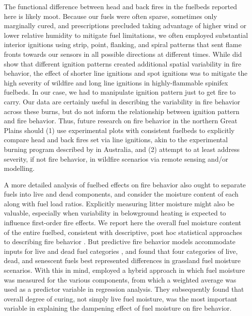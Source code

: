 \documentclass[referee, 
		     sn-basic]{sn-jnl}
\begin{document}
\begin{linenumbers}
The functional difference between head and back fires in the fuelbeds reported here is likely moot. 
Because our fuels were often sparse, sometimes only marginally cured, and prescriptions precluded taking advantage of higher wind or lower relative humidity to mitigate fuel
limitations, we often employed substantial interior ignitions using
strip, point, flanking, and spiral patterns that sent flame fronts
towards our sensors in all possible directions at different times. While
\citet{williams2015} did show that different ignition patterns created
additional spatial variability in fire behavior, the effect of shorter
line ignitions and spot ignitions was to mitigate the high severity of
wildfire and long line ignitions in highly-flammable spinifex fuelbeds.
In our case, we had to manipulate ignition pattern just to get fire to
carry. Our data are certainly useful in describing the variability in
fire behavior across these burns, but do not inform the relationship
between ignition pattern and fire behavior. Thus, future research on
fire behavior in the northern Great Plains should (1) use experimental
plots with consistent fuelbeds to explicitly compare head and back fires
set via line ignitions, akin to the experimental burning program
described by \citet{cruz2015} in Australia, and (2) attempt to at least
address severity, if not fire behavior, in wildfire scenarios via remote
sensing and/or modelling.

A more detailed analysis of fuelbed effects on fire behavior also ought
to separate fuels into live and dead components, and consider the
moisture content of each along with fuel load ratios. Explicitly
measuring litter moisture might also be valuable, especially when
variability in belowground heating is expected to influence first-order
fire effects. We report here the overall fuel moisture content of the
entire fuelbed, consistent with descriptive, post hoc statistical
approaches to describing fire behavior
\citep{trollope1978, trollope1985, bidwell1992, trollope2002, mcgranahan2016}.
But predictive fire behavior models accommodate inputs for live and dead
fuel categories \citep{scott2005}, and \citet{kidnie2015a} found that
four categories of live, dead, and senescent fuels best represented
differences in grassland fuel moisture scenarios. With this in mind,
\citet{cruz2015} employed a hybrid approach in which fuel moisture was
measured for the various components, from which a weighted average was
used as a predictor variable in regression analysis. They subsequently
found that overall degree of curing, not simply live fuel moisture, was
the most important variable in explaining the dampening effect of fuel
moisture on fire behavior.


\end{linenumbers}
\end{document}
